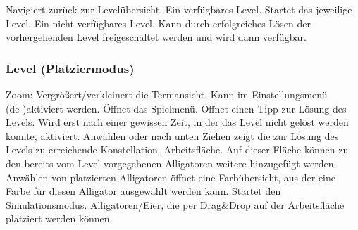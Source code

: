 \begin{requirements}
 Navigiert zurück zur Levelübersicht.
 Ein verfügbares Level. Startet das jeweilige Level.
 Ein nicht verfügbares Level. Kann durch erfolgreiches Lösen der vorhergehenden Level freigeschaltet werden und wird dann verfügbar.
\end{requirements}

\subsubsection{Level (Platziermodus)}

\begin{center}
\setlength\fboxsep{20pt}
\setlength\fboxrule{1pt}
\end{center}

\begin{requirements}
 Zoom: Vergrößert/verkleinert die Termansicht. Kann im Einstellungsmenü (de-)aktiviert werden.
 Öffnet das Spielmenü.
 Öffnet einen Tipp zur Lösung des Levels. Wird erst nach einer gewissen Zeit, in der das Level nicht gelöst werden konnte, aktiviert.
 Anwählen oder nach unten Ziehen zeigt die zur Lösung des Levels zu erreichende Konstellation.
 Arbeitsfläche. Auf dieser Fläche können zu den bereits vom Level vorgegebenen Alligatoren weitere hinzugefügt werden. Anwählen von platzierten Alligatoren öffnet eine Farbübersicht, aus der eine Farbe für diesen Alligator ausgewählt werden kann.
 Startet den Simulationsmodus.
 Alligatoren/Eier, die per Drag\&Drop auf der Arbeitsfläche platziert werden können.
\end{requirements}

